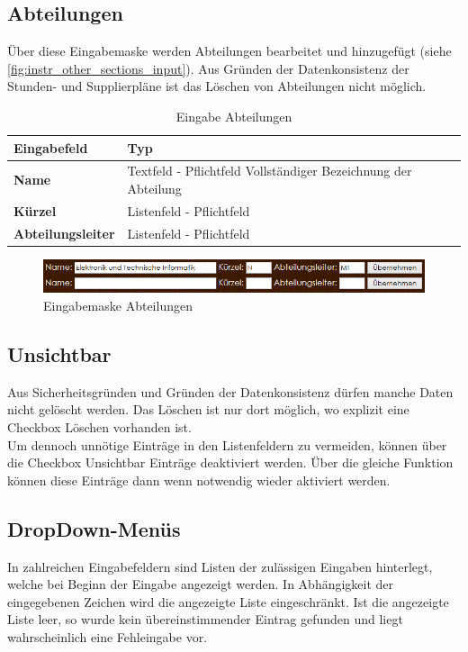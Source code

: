 \subsection{Abteilungen}
Über diese Eingabemaske werden Abteilungen bearbeitet und hinzugefügt (siehe \autoref{fig:instr_other_sections_input}). Aus Gründen der Datenkonsistenz der Stunden- und Supplierpläne ist das Löschen von Abteilungen nicht möglich.
\begin{table}[H]
\centering
\begin{tabular}{p{3 cm}p{10 cm}}
   \toprule
   \textbf{Eingabefeld} & \textbf{Typ} \\
   \midrule
          \textbf{Name} & Textfeld - Pflichtfeld \newline Vollständiger Bezeichnung der Abteilung \\
          \hline
          \textbf{Kürzel} & Listenfeld - Pflichtfeld \\
          \hline
          \textbf{Abteilungsleiter} & Listenfeld - Pflichtfeld \\
   \bottomrule
\end{tabular}
\caption{Eingabe Abteilungen}
\end{table}
\begin{figure}[H]
\centering
\includegraphics[keepaspectratio=true, width=17cm]{images/screenshots/sections_input.png}
\caption{Eingabemaske Abteilungen}
\label{fig:instr_other_sections_input}
\end{figure}
\subsection{Unsichtbar}\label{sec:instr_other_hidden}
Aus Sicherheitsgründen und Gründen der Datenkonsistenz dürfen manche Daten nicht gelöscht werden. Das Löschen ist nur dort möglich, wo explizit eine Checkbox Löschen vorhanden ist.\\
Um dennoch unnötige Einträge in den Listenfeldern zu vermeiden, können über die Checkbox Unsichtbar Einträge deaktiviert werden. Über die gleiche Funktion können diese Einträge dann wenn notwendig wieder aktiviert werden.
\subsection{DropDown-Menüs}
In zahlreichen Eingabefeldern sind Listen der zulässigen Eingaben hinterlegt, welche bei Beginn der Eingabe angezeigt werden. In Abhängigkeit der eingegebenen Zeichen wird die angezeigte Liste eingeschränkt. Ist die angezeigte Liste leer, so wurde kein übereinstimmender Eintrag gefunden und liegt wahrscheinlich eine Fehleingabe vor.